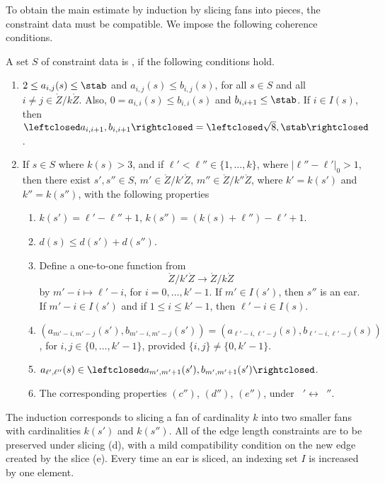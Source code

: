 To obtain the main estimate by induction by slicing fans
into pieces, the constraint data must be compatible. We impose the
following coherence conditions.   
\begin{definition}[coherence]
A set $S$ of constraint data is , if the following conditions
hold.
\begin{enumerate}
\item {} $2\le a_{i,j}(s)\le \stab$ and $a_{i,j}(s)\le
  b_{i,j}(s)$, for all $s\in S$ and all $i\ne j\in
  \ring{Z}/k\ring{Z}$.  Also, $0 = a_{i,i}(s)\le b_{i,i}(s)$ and
  $b_{i,i+1}\le \stab$.  If $i\in I(s)$, then $\leftclosed
  a_{i,i+1},b_{i,i+1}\rightclosed=\leftclosed\sqrt{8},\stab\rightclosed$.
\item {}
  If $s\in S$ where $k(s)>3$, and if  $\ell'<\ell''\in \{1,\ldots, k\}$, where
    $|\ell''-\ell'|_0 > 1$, then
 there exist $s',s''\in S$, $m'\in \ring{Z}/k'\ring{Z}$, $m''\in \ring{Z}/k''\ring{Z}$,
where $k'=k(s')$ and $k''=k(s'')$,
with the following
properties
\begin{enumerate}
\item  $k(s') = \ell' - \ell'' +1$,
  $k(s'') = (k(s)+\ell'')  - \ell' + 1$.
\item $d(s) \le d(s') + d(s'')$.
\item Define a one-to-one function from 
  \begin{equation}\label{eqn:injk'}
  \ring{Z}/k'\ring{Z}\to \ring{Z}/k\ring{Z}
   \end{equation}
 by $m'-i \mapsto \ell'-i$, for $i=0,\ldots,k'-1$.
If $m'\in I(s')$, then $s''$ is an ear.   If
$m'-i\in I(s')$ and if $1\le i\le k'-1$, then $\ell'-i\in I(s)$.
\item $(a_{m'-i,m'-j}(s'),b_{m'-i,m'-j}(s'))=(a_{\ell'-i,\ell'-j}(s),b_{\ell'-i,\ell'-j}(s))$,
  for $i,j\in \{0,\ldots,k'-1\}$, provided $\{i,j\}\ne \{0,k'-1\}$.
\item $a_{\ell',\ell''}(s) \in \leftclosed a_{m',m'+1}(s'),b_{m',m'+1}(s')\rightclosed$.
\item The corresponding properties $(c'')$, $(d'')$, $(e'')$, 
under $\phantom{a}'\leftrightarrow \phantom{a}''$.
\end{enumerate}
\end{enumerate}
\end{definition}

The induction corresponds to slicing a fan of cardinality $k$ into
two smaller fans with cardinalities $k(s')$ and $k(s'')$.  All of the edge
length constraints are to be preserved under slicing (d), with a
mild compatibility condition on the new edge created by the slice (e).
Every time an ear is sliced, an indexing set $I$ is increased by one
element.

